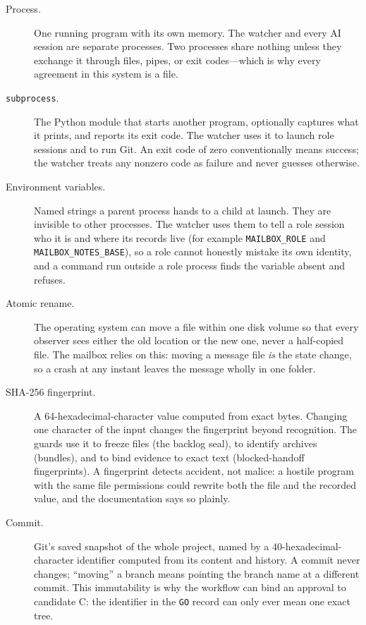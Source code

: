 \documentclass[10pt,aps,prd,twocolumn,nofootinbib]{revtex4-2}
\newcommand{\code}[1]{\texttt{#1}}
\begin{document}
\begin{description}
  \item[Process.]  One running program with its own memory.  The
  watcher and every AI session are separate processes.  Two processes
  share nothing unless they exchange it through files, pipes, or exit
  codes---which is why every agreement in this system is a file.

  \item[\code{subprocess}.]  The Python module that starts another
  program, optionally captures what it prints, and reports its exit
  code.  The watcher uses it to launch role sessions and to run Git.
  An exit code of zero conventionally means success; the watcher treats
  any nonzero code as failure and never guesses otherwise.

  \item[Environment variables.]  Named strings a parent process hands
  to a child at launch.  They are invisible to other processes.  The
  watcher uses them to tell a role session who it is and where its
  records live (for example \code{MAILBOX\_ROLE} and
  \code{MAILBOX\_NOTES\_BASE}), so a role cannot honestly mistake its
  own identity, and a command run outside a role process finds the
  variable absent and refuses.

  \item[Atomic rename.]  The operating system can move a file within
  one disk volume so that every observer sees either the old location
  or the new one, never a half-copied file.  The mailbox relies on
  this: moving a message file \emph{is} the state change, so a crash at
  any instant leaves the message wholly in one folder.

  \item[SHA-256 fingerprint.]  A 64-hexadecimal-character value
  computed from exact bytes.  Changing one character of the input
  changes the fingerprint beyond recognition.  The guards use it to
  freeze files (the backlog seal), to identify archives (bundles), and
  to bind evidence to exact text (blocked-handoff fingerprints).  A
  fingerprint detects accident, not malice: a hostile program with the
  same file permissions could rewrite both the file and the recorded
  value, and the documentation says so plainly.

  \item[Commit.]  Git's saved snapshot of the whole project, named by a
  40-hexadecimal-character identifier computed from its content and
  history.  A commit never changes; ``moving'' a branch means pointing
  the branch name at a different commit.  This immutability is why the
  workflow can bind an approval to candidate C: the identifier in the
  \code{GO} record can only ever mean one exact tree.


\end{description}
\end{document}
